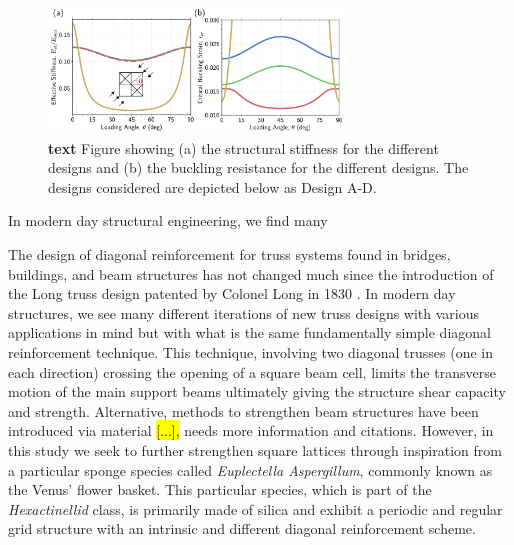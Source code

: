 \documentclass[9pt,twocolumn,twoside]{fernandes_paper}
\newcommand{\mf}[1]{\colorbox{blue!10}{\color{color3}#1}}
\begin{document}
\begin{figure}[ht]
	\captionsetup{width=0.8\textwidth}
	\begin{center}
		\includegraphics[width=0.7\textwidth]{Fig3}
	\end{center}
	\caption{\textbf{text} Figure showing (a) the structural stiffness for the different designs and (b) the buckling resistance for the different designs. The designs considered are depicted below as Design A-D.} \label{Fig3}
\end{figure}



In modern day structural engineering, we find many 

The design of diagonal reinforcement for truss systems found in bridges, buildings, and beam structures has not changed much since the introduction of the Long truss design patented by Colonel Long in 1830 \citep{waddell1916}. In modern day structures, we see many different iterations of new truss designs with various applications in mind but with what is the same fundamentally simple diagonal reinforcement technique. This technique, involving two diagonal trusses (one in each direction) crossing the opening of a square beam cell, limits the transverse motion of the main support beams ultimately giving the structure shear capacity and strength. Alternative, methods to strengthen beam structures have been introduced via material \hl{[...],} \mf{needs more information and citations}. However, in this study we seek to further strengthen square lattices through inspiration from a particular sponge species called \textit{Euplectella Aspergillum}, commonly known as the Venus' flower basket. This particular species, which is part of the \textit{Hexactinellid} class, is primarily made of silica and exhibit a periodic and regular grid structure with an intrinsic and different diagonal reinforcement scheme. 
\end{document}
